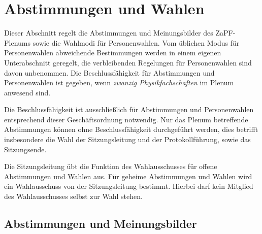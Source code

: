 \documentclass[
  a4paper,
  oneside]{scrartcl}
\begin{document}
\hypertarget{abstimmungen-und-wahlen}{%
\section{Abstimmungen und Wahlen}\label{abstimmungen-und-wahlen}}

Dieser Abschnitt regelt die Abstimmungen und Meinungsbilder des
ZaPF-Plenums sowie die Wahlmodi für Personenwahlen. Vom üblichen Modus
für Personenwahlen abweichende Bestimmungen werden in einem eigenen
Unterabschnitt geregelt, die verbleibenden Regelungen für Personenwahlen
sind davon unbenommen. Die Beschlussfähigkeit für Abstimmungen und
Personenwahlen ist gegeben, wenn \emph{zwanzig Physikfachschaften} im
Plenum anwesend sind.

Die Beschlussfähigkeit ist ausschließlich für Abstimmungen und
Personenwahlen entsprechend dieser Geschäftsordnung notwendig. Nur das
Plenum betreffende Abstimmungen können ohne Beschlussfähigkeit
durchgeführt werden, dies betrifft insbesondere die Wahl der
Sitzungsleitung und der Protokollführung, sowie das Sitzungsende.

Die Sitzungsleitung übt die Funktion des Wahlausschusses für offene
Abstimmungen und Wahlen aus. Für geheime Abstimmungen und Wahlen wird
ein Wahlausschuss von der Sitzungsleitung bestimmt. Hierbei darf kein
Mitglied des Wahlausschusses selbst zur Wahl stehen.

\hypertarget{abstimmungen-und-meinungsbilder}{%
\subsection{Abstimmungen und
Meinungsbilder}\label{abstimmungen-und-meinungsbilder}}
\end{document}
